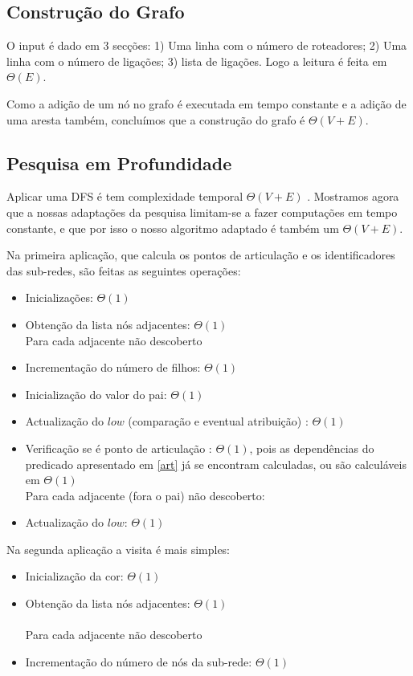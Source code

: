 \documentclass[a4paper, 12pt, conference]{ieeeconf}
\begin{document}
\subsection{Construção do Grafo}
O input é dado em $3$ secções: 1) Uma linha com o número de roteadores; 2) Uma
linha com o número de ligações; 3) lista de ligações. Logo a leitura é feita em
$\Theta(E)$.

Como a adição de um nó no grafo é executada em tempo constante e a adição de uma
aresta também, concluímos que a construção do grafo é $\Theta(V + E)$.

\subsection{Pesquisa em Profundidade}
Aplicar uma DFS é tem complexidade temporal $\Theta(V + E)$ \cite{cormen}.
Mostramos agora que a nossas adaptações da pesquisa limitam-se a fazer computações
em tempo constante, e que por isso o nosso algoritmo adaptado é também um $\Theta(V + E)$.

Na primeira aplicação, que calcula os pontos de articulação e os identificadores
das sub-redes, são feitas as seguintes operações:
\begin{itemize}
  \item Inicializações: $\Theta(1)$
  \item Obtenção da lista nós adjacentes: $\Theta(1)$\\

  Para cada adjacente não descoberto
  \item Incrementação do número de filhos: $\Theta(1)$
  \item Inicialização do valor do pai: $\Theta(1)$
  \item Actualização do $low$ (comparação e eventual atribuição) : $\Theta(1)$
  \item Verificação se é ponto de articulação : $\Theta(1)$, pois as
    dependências do predicado apresentado em \ref{art} já se encontram
    calculadas, ou são calculáveis em $\Theta(1)$ \\

  Para cada adjacente (fora o pai) não descoberto:
  \item Actualização do $low$: $\Theta(1)$
\end{itemize}

\newpage
Na segunda aplicação a visita é mais simples:
\begin{itemize}
  \item Inicialização da cor: $\Theta(1)$
  \item Obtenção da lista nós adjacentes: $\Theta(1)$\\ \\
  Para cada adjacente não descoberto
  \item Incrementação do número de nós da sub-rede: $\Theta(1)$
\end{itemize}
\end{document}
